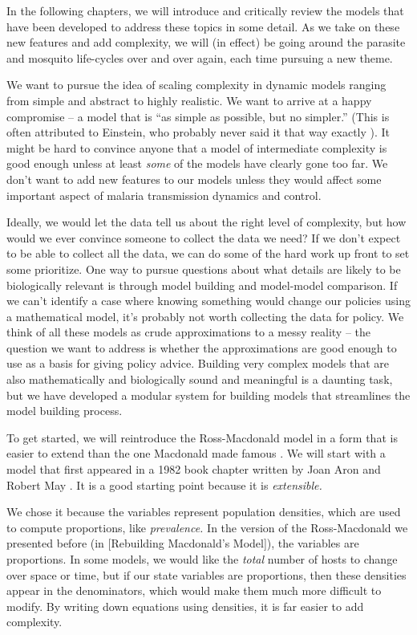 \documentclass[
]{book}
\begin{document}
In the following chapters, we will introduce and critically review the models that have been developed to address these topics in some detail. As we take on these new features and add complexity, we will (in effect) be going around the parasite and mosquito life-cycles over and over again, each time pursuing a new theme.

We want to pursue the idea of scaling complexity in dynamic models ranging from simple and abstract to highly realistic. We want to arrive at a happy compromise -- a model that is ``as simple as possible, but no simpler.'' (This is often attributed to Einstein, who probably never said it that way exactly \autocite{RobinsonA2018DidEinstein}). It might be hard to convince anyone that a model of intermediate complexity is good enough unless at least \emph{some} of the models have clearly gone too far. We don't want to add new features to our models unless they would affect some important aspect of malaria transmission dynamics and control.

Ideally, we would let the data tell us about the right level of complexity, but how would we ever convince someone to collect the data we need? If we don't expect to be able to collect all the data, we can do some of the hard work up front to set some prioritize.
One way to pursue questions about what details are likely to be biologically relevant is through model building and model-model comparison. If we can't identify a case where knowing something would change our policies using a mathematical model, it's probably not worth collecting the data for policy. We think of all these models as crude approximations to a messy reality -- the question we want to address is whether the approximations are good enough to use as a basis for giving policy advice. Building very complex models that are also mathematically and biologically sound and meaningful is a daunting task, but we have developed a modular system for building models that streamlines the model building process.

To get started, we will reintroduce the Ross-Macdonald model in a form that is easier to extend than the one Macdonald made famous \autocite{SmithDL2012_RossMacdonald}. We will start with a model that first appeared in a 1982 book chapter written by Joan Aron and Robert May \autocite{AronJL1982PopulationDynamics}. It is a good starting point because it is \emph{extensible.}

We chose it because the variables represent population densities, which are used to compute proportions, like \emph{prevalence.} In the version of the Ross-Macdonald we presented before (in {[}Rebuilding Macdonald's Model{]}), the variables are proportions. In some models, we would like the \emph{total} number of hosts to change over space or time, but if our state variables are proportions, then these densities appear in the denominators, which would make them much more difficult to modify. By writing down equations using densities, it is far easier to add complexity.
\end{document}
